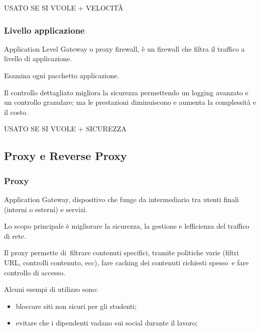 \documentclass[
]{article}
\providecommand{\tightlist}{%
  \setlength{\itemsep}{0pt}\setlength{\parskip}{0pt}}
\begin{document}
{}

{USATO SE SI VUOLE + VELOCITÀ}

\subsubsection{\texorpdfstring{{Livello
applicazione}}{Livello applicazione}}\label{h.kbitsx8cw1y4}

{Application Level Gateway o proxy firewall, è un firewall che filtra il
traffico a livello di applicazione. }

{}

{Esamina ogni pacchetto applicazione.}

{}

{Il controllo dettagliato migliora la }{sicurezza }{permettendo un
}{logging avanzato }{e un }{controllo granulare}{; }{ma }{le
}{prestazioni diminuiscono }{e }{aumenta }{la }{complessità }{e il
}{costo}{.}

{}

{USATO SE SI VUOLE + SICUREZZA}

\subsection{\texorpdfstring{{Proxy e Reverse
Proxy}}{Proxy e Reverse Proxy}}\label{h.x9mcihub2gj6}

\subsubsection{\texorpdfstring{{Proxy}}{Proxy}}\label{h.opgq8uxmmtdq}

{Application Gateway, dispositivo che funge da intermediario tra utenti
finali (interni o esterni) e servizi. }

{}

{Lo scopo principale è migliorare la sicurezza, la gestione e
l\textquotesingle efficienza del traffico di rete. }

{}

{Il proxy permette di}{~filtrare contenuti specifici}{, tramite
politiche varie (filtri URL, controlli contenuto, ecc), fare }{caching
dei contenuti richiesti spesso}{~e fare }{controllo di accesso}{.}

{}

{Alcuni esempi di utilizzo sono:}

\begin{itemize}
\tightlist
\item
  {bloccare siti non sicuri per gli studenti;}
\item
  {evitare che i dipendenti vadano sui social durante il lavoro;}
\end{itemize}
\end{document}
